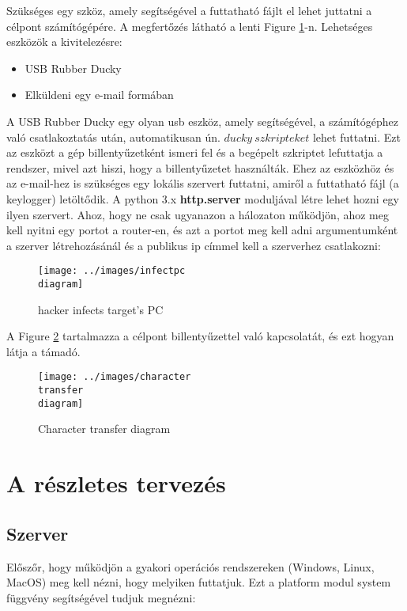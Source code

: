 \documentclass[a4paper, 11pt]{article}
\begin{document}
Szükséges egy szköz, amely segítségével a futtatható fájlt el lehet juttatni a célpont számítógépére. A megfertőzés látható a lenti Figure \ref{fig:infectpcdia}-n.
Lehetséges eszközök a kivitelezésre:
\begin{itemize}
\item USB Rubber Ducky
\item Elküldeni egy e-mail formában
\end{itemize}
A USB Rubber Ducky egy olyan usb eszköz, amely segítségével, a számítógéphez való csatlakoztatás után, automatikusan ún. $ducky\ szkripteket$ lehet futtatni. Ezt az eszközt a gép billentyűzetként ismeri fel és a begépelt szkriptet lefuttatja a rendszer, mivel azt hiszi, hogy a billentyűzetet használták. Ehez az eszközhöz és az e-mail-hez is szükséges egy lokális szervert futtatni, amiről a futtatható fájl (a keylogger) letöltődik. A python 3.x \textbf{http.server} moduljával létre lehet hozni egy ilyen szervert. Ahoz, hogy ne csak ugyanazon a hálozaton működjön, ahoz meg kell nyitni egy portot a router-en, és azt a portot meg kell adni argumentumként a szerver létrehozásánál és a publikus ip címmel kell a szerverhez csatlakozni:

\begin{figure}[H]
\centering
\texttt{[image: ../images/infectpc\\ diagram]}
\caption{hacker infects target's PC}
\label{fig:infectpcdia}
\end{figure}

A Figure \ref{fig:chartransferdia} tartalmazza a célpont billentyűzettel való kapcsolatát, és ezt hogyan látja a támadó.

\begin{figure}[H]
\centering
\texttt{[image: ../images/character\\ transfer\\ diagram]}
\caption{Character transfer diagram}
\label{fig:chartransferdia}
\end{figure}

\section{A részletes tervezés}\label{sec:plan}

\subsection{Szerver}\label{subsec:server}
Előszőr, hogy működjön a gyakori operációs rendszereken (Windows, Linux, MacOS) meg kell nézni, hogy melyiken futtatjuk. Ezt a platform modul system függvény segítségével tudjuk megnézni:
\end{document}
